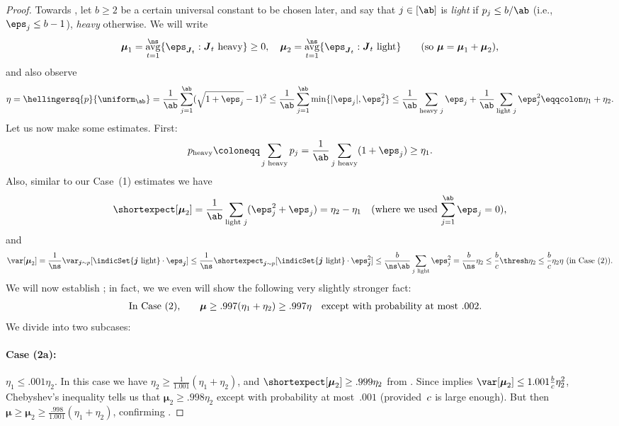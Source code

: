 \documentclass[11pt]{article}
\DeclareMathOperator*{\avg}{avg}
\newcommand{\E}{\shortexpect}
\newcommand{\bj}{\boldsymbol{j}}
\newcommand{\bJ}{\boldsymbol{J}}
\newcommand{\bmu}{\boldsymbol{\mu}}
\begin{document}
\begin{proof}
	Towards ,  let  $b \geq 2$ be a certain universal constant to be chosen later, and say that $j \in [\ab]$ is \emph{light} if $p_j \leq b/\ab$ (i.e., $\eps_j \leq b-1$), \emph{heavy} otherwise. 
	We will write 
	\begin{equation}
		\bmu_1 = \avg_{t=1}^{\ns}\{\eps_{\bJ_t} : \bJ_t \text{ heavy}\} \geq 0, \quad	 \bmu_2 = \avg_{t=1}^{\ns}\{\eps_{\bJ_t} : \bJ_t \text{ light}\} \qquad \text{(so $\bmu = \bmu_1 + \bmu_2$),}
	\end{equation}
	and also observe
	\begin{equation}	\label{eqn:helly}
		\eta =\hellingersq{p}{\uniform_{\ab}} = \frac{1}{\ab} \sum_{j=1}^{\ab}(\sqrt{1+\eps_j} - 1)^2 \leq \frac{1}{\ab} \sum_{j=1}^{\ab}\min\{|\eps_j|, \eps_j^2\} \leq \frac{1}{\ab} \sum_{\text{heavy }j} \eps_j + \frac{1}{\ab} \sum_{\text{light }j}\eps_j^2 \eqqcolon \eta_1 + \eta_2.
	\end{equation}
	Let us now make some estimates.
	 First:
	\begin{equation} \label{eqn:pheavy}
		p_{\text{heavy}} \coloneqq \sum_{j \text{ heavy}} p_j = \frac{1}{\ab}\sum_{j \text{ heavy}} (1+\eps_j) \geq \eta_1.%
	\end{equation}
	Also, similar to our Case~(1) estimates we have
	\begin{equation}	\label{eqn:case2a2}
		\E[\bmu_2] = \frac{1}{\ab} \sum_{\text{light } j} (\eps_j^2 + \eps_j) = \eta_2  - \eta_1 \quad \text{(where we used $\sum_{j=1}^{\ab} \eps_j = 0$),}
	\end{equation}
	and
	\begin{equation} \label{eqn:thevar}
		\var[\bmu_2] = \frac{1}{\ns} \var_{\bj \sim p}[\indicSet{\bj \text{ light}} \cdot \eps_{\bj}] 
		\leq \frac{1}{\ns} \E_{\bj \sim p}[\indicSet{\bj \text{ light}} \cdot \eps_{\bj}^2] 
		\leq \frac{b}{\ns\ab} \sum_{j \text{ light}} \eps_j^2 = \frac{b}{\ns} \eta_2 \leq \frac{b}{\cc} \thresh\eta_2 \leq \frac{b}{\cc}\eta_2 \eta \text{ (in Case~(2)).}
	\end{equation}
	We will now establish ; in fact, we we even will show the following very slightly stronger fact:
	\begin{align}	
		\text{In Case (2),\qquad} \bmu & \geq .997(\eta_1+\eta_2) \geq .997\eta && \text{except with probability at most $.002$.} \label{eqn:case22}	
	\end{align}
	We divide into two subcases:
	\paragraph{Case (2a):} $\eta_1 \leq .001\eta_2$.  \quad In this case we have $\eta_2 \geq \frac{1}{1.001} (\eta_1+\eta_2)$, and $\E[\bmu_2] \geq .999\eta_2$ from .  Since  implies $\var[\bmu_2] \leq 1.001\frac{b}{\cc} \eta_2^2$, Chebyshev's inequality tells us that $\bmu_2 \geq .998\eta_2$ except with probability at most~$.001$ (provided~$c$ is large enough).  
	But then $\bmu \geq \bmu_2 \geq \frac{.998}{1.001}(\eta_1+\eta_2)$, confirming .

\end{proof}
\end{document}
